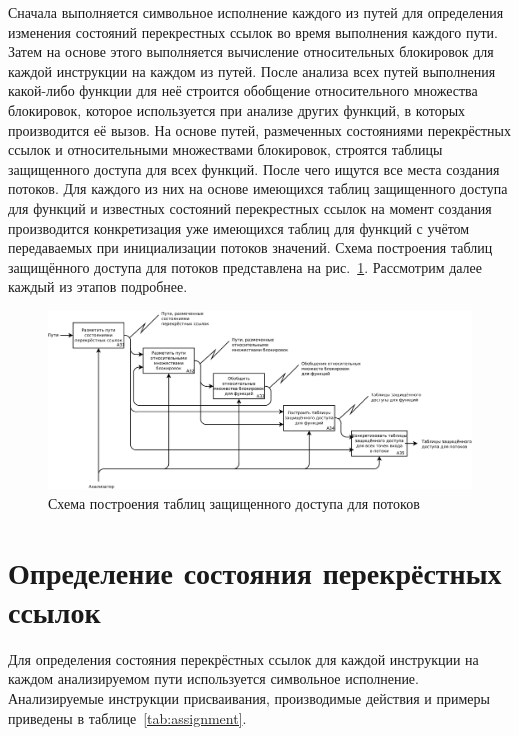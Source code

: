 Сначала выполняется символьное исполнение каждого из путей для определения изменения состояний перекрестных ссылок во время выполнения каждого пути. Затем на основе этого выполняется вычисление относительных блокировок для каждой инструкции на каждом из путей. После анализа всех путей выполнения какой-либо функции для неё строится обобщение относительного множества блокировок, которое используется при анализе других  функций, в которых производится её вызов. На основе путей, размеченных состояниями перекрёстных ссылок и относительными множествами блокировок, строятся таблицы защищенного доступа для всех функций. После чего ищутся все места создания потоков.  Для каждого из них на основе имеющихся таблиц защищенного доступа для функций и известных состояний перекрестных ссылок на момент создания производится конкретизация уже имеющихся таблиц для функций с учётом передаваемых при инициализации потоков значений. Схема построения таблиц защищённого доступа для потоков представлена на рис.~\ref{fig:form-tables}. Рассмотрим далее каждый из этапов подробнее.

\begin{figure}
  \centering
  \includegraphics[width=\textwidth]{inc/dia/form-tables}
  \caption{Схема построения таблиц защищенного доступа для потоков}
  \label{fig:form-tables}
\end{figure}

\section{Определение состояния перекрёстных ссылок}

Для определения состояния перекрёстных ссылок для каждой инструкции на каждом анализируемом пути используется символьное исполнение. Анализируемые инструкции присваивания, производимые действия и примеры приведены в таблице~\ref{tab:assignment}.

